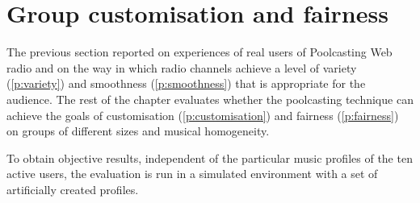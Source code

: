 
% 
% 
% 
% 
% 
% 
% 
% 


\section{Group customisation and fairness} %
\label{sec:evaluation_of_this_technique}

The previous section reported on experiences of real users of Poolcasting Web radio and on the way in which radio channels achieve a level of variety (\ref{p:variety}) and smoothness (\ref{p:smoothness}) that is appropriate for the audience.
%
The rest of the chapter evaluates whether the poolcasting technique can achieve the goals of customisation (\ref{p:customisation}) and fairness (\ref{p:fairness}) on groups of different sizes and musical homogeneity.

To obtain objective results, independent of the particular music profiles of the ten active users, the evaluation is run in a simulated environment with a set of artificially created profiles.

 
